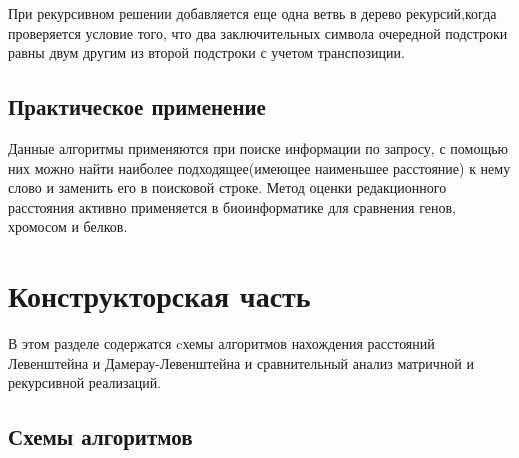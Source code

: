 \documentclass[a4paper,12pt]{report}
\begin{document}
При рекурсивном решении добавляется еще одна ветвь в дерево рекурсий,когда проверяется условие того, что два заключительных символа очередной подстроки равны двум другим из второй подстроки с учетом транспозиции.

\section{Практическое применение}
Данные алгоритмы применяются при поиске информации по запросу, с помощью них можно найти наиболее подходящее(имеющее наименьшее расстояние) к нему слово и заменить его в поисковой строке. Метод оценки редакционного расстояния активно применяется в биоинформатике для сравнения генов, хромосом и белков.

\chapter{Конструкторская часть}
В этом разделе содержатся cхемы алгоритмов нахождения расстояний Левенштейна и Дамерау-Левенштейна и сравнительный анализ матричной и рекурсивной реализаций.
\newpage
\section{Схемы алгоритмов}
\end{document}
